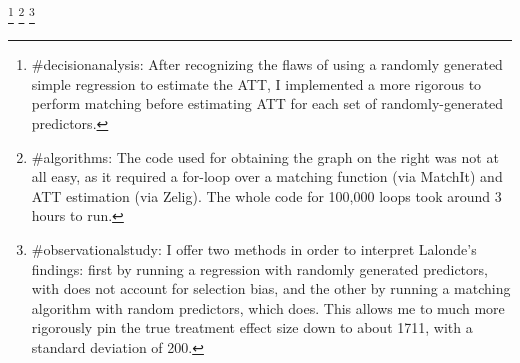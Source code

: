 \documentclass[11pt, oneside]{article}
\begin{document}
\footnote{\#decisionanalysis: After recognizing the flaws of using a randomly generated simple regression to estimate the ATT, I implemented a more rigorous to perform matching before estimating ATT for each set of randomly-generated predictors.}
\footnote{\#algorithms: The code used for obtaining the graph on the right was not at all easy, as it required a for-loop over a matching function (via MatchIt) and ATT estimation (via Zelig). The whole code for 100,000 loops took around 3 hours to run.}
\footnote{\#observationalstudy: I offer two methods in order to interpret Lalonde's findings: first by running a regression with randomly generated predictors, with does not account for selection bias, and the other by running a matching algorithm with random predictors, which does. This allows me to much more rigorously pin the true treatment effect size down to about 1711, with a standard deviation of 200.}
\end{document}
